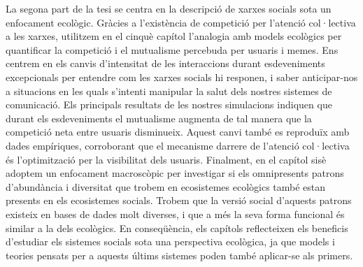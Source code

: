 La segona part de la tesi se centra en la descripció de xarxes socials sota un enfocament ecològic. Gràcies a l'existència de competició per l'atenció col·lectiva a les xarxes, utilitzem en el cinquè capítol l'analogia amb models ecològics per quantificar la competició i el mutualisme percebuda per usuaris i memes. Ens centrem en els canvis d'intensitat de les interaccions durant esdeveniments excepcionals per entendre com les xarxes socials hi responen, i saber anticipar-nos a situacions en les quals s'intenti manipular la salut dels nostres sistemes de comunicació. Els principals resultats de les nostres simulacions indiquen que durant els esdeveniments el mutualisme augmenta de tal manera que la competició neta entre usuaris disminueix. Aquest canvi també es reproduïx amb dades empíriques, corroborant que el mecanisme darrere de l'atenció col·lectiva és l'optimització per la visibilitat dels usuaris. Finalment, en el capítol sisè adoptem un enfocament macroscòpic per investigar si els omnipresents patrons d'abundància i diversitat que trobem en ecosistemes ecològics també estan presents en els ecosistemes socials. Trobem que la versió social d'aquests patrons existeix en bases de dades molt diverses, i que a més la seva forma funcional és similar a la dels ecològics. En conseqüència, els capítols reflecteixen els beneficis d'estudiar els sistemes socials sota una perspectiva ecològica, ja que models i teories pensats per a aquests últims sistemes poden també aplicar-se als primers. 